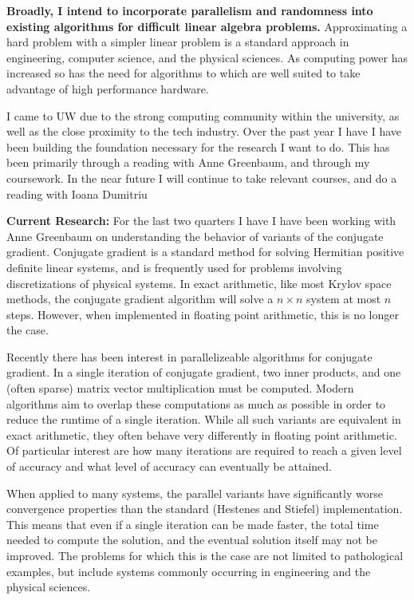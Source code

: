 \documentclass[11pt]{article}
\begin{document}
\maketitle
\vspace{2em}

\textbf{Broadly, I intend to incorporate parallelism and randomness into existing algorithms for difficult linear algebra problems.}
Approximating a hard problem with a simpler linear problem is a standard approach in engineering, computer science, and the physical sciences. As computing power has increased so has the need for algorithms to which are well suited to take advantage of high performance hardware.

I came to UW due to the strong computing community within the university, as well as the close proximity to the tech industry. Over the past year I have I have been building the foundation necessary for the research I want to do. This has been primarily through a reading with Anne Greenbaum, and through my coursework. In the near future I will continue to take relevant courses, and do a reading with Ioana Dumitriu 

\textbf{Current Research:}
For the last two quarters I have I have been working with Anne Greenbaum on understanding the behavior of variants of the conjugate gradient. 
Conjugate gradient is a standard method for solving Hermitian positive definite linear systems, and is frequently used for problems involving discretizations of physical systems. In exact arithmetic, like most Krylov space methods, the conjugate gradient algorithm will solve a \( n\times n \) system at most \( n \) steps. However, when implemented in floating point arithmetic, this is no longer the case.

Recently there has been interest in parallelizeable algorithms for conjugate gradient. In a single iteration of conjugate gradient, two inner products, and one (often sparse) matrix vector multiplication must be computed. Modern algorithms aim to overlap these computations as much as possible in order to reduce the runtime of a single iteration.
While all such variants are equivalent in exact arithmetic, they often behave very differently in floating point arithmetic. Of particular interest are how many iterations are required to reach a given level of accuracy and what level of accuracy can eventually be attained.

When applied to many systems, the parallel variants have significantly worse convergence properties than the standard (Hestenes and Stiefel) implementation. 
This means that even if a single iteration can be made faster, the total time needed to compute the solution, and the eventual solution itself may not be improved. The problems for which this is the case are not limited to pathological examples, but include systems commonly occurring in engineering and the physical sciences.
\end{document}
